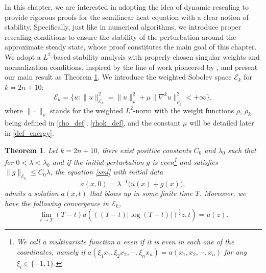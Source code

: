 \documentclass[12pt]{caltech_thesis}
\newtheorem{theorem}{Theorem}[section]
\numberwithin{equation}{section}
\begin{document}
In this chapter, we are interested in adopting the idea of dynamic rescaling to provide rigorous proofs for the semilinear heat equation with a clear notion of stability. Specifically, just like in numerical algorithms, we introduce proper rescaling conditions to ensure the stability of the perturbation around the approximate steady state, whose proof constitutes the main goal of this chapter.  We adopt a $L^2$-based stability analysis with properly chosen singular weights and normalization conditions, inspired by the line of work pioneered by \cite{chen2021finite, chen2019finite2}, and present our main result as Theorem \ref{thm1}. {We introduce the weighted Sobolev space $\mathcal{E}_k$ for $k = 2n + 10$: 
\begin{equation}\label{def:Ek}
\mathcal{E}_k = \Big\{u: \|u\|^2_{\mathcal{E}_k} = \| u\|^2_{\rho}+\mu\|\nabla^k u\|_{\rho_k}^2 < +\infty\Big\},
\end{equation}
where $\| \cdot\|_{\rho}$ stands for the weighted $L^2$-norm with the weight functions $\rho$, $\rho_k$ being defined in  \eqref{rho_def}, \eqref{rhok_def}, and the constant $\mu$ will be detailed later in \eqref{def_energy}.} 
\begin{theorem}\label{thm1} Let $k = 2n + 10$, there exist positive constants $C_0$ and $\lambda_0$ such that for $0<\lambda<\lambda_0$ and if the initial perturbation {$g$ is even\footnote{We call a multivariate function $a$ even if it is even in each one of the coordinates, namely if $a(\xi_1 x_1,\xi_2 x_2,\cdots,\xi_n x_n)=a( x_1,x_2,\cdots, x_n)$ for any $\xi_i\in\{-1,1\}$.} and satisfies $\|g\|_{\mathcal{E}_k} \leq C_0\lambda$,} the equation \eqref{sml} with initial data $$a(x,0)=\lambda^{-1}\big(\bar{u}(x)+g(x)\big),$$ 
{admits a solution $a(x,t)$ that blows up in some finite time $T$.}  Moreover, we have the following convergence in $\mathcal{E}_k$,
$$\lim _{t \rightarrow T}(T-t) a\left(((T-t)|\log (T-t)|)^{\frac{1}{2}} z, t\right)=\bar{u}(z).$$
\end{theorem}
\end{document}
